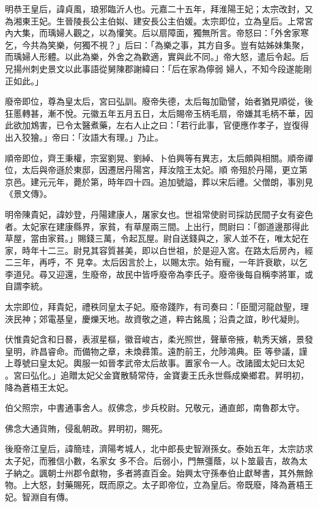 \begin{pinyinscope}
 明恭王皇后，諱貞風，琅邪臨沂人也。元嘉二十五年，拜淮陽王妃；太宗改封，又為湘東王妃。生晉陵長公主伯姒、建安長公主伯媛。太宗即位，立為皇后。上常宮內大集，而瑀婦人觀之，以為懽笑。后以扇障面，獨無所言。帝怒曰：「外舍家寒乞，今共為笑樂，何獨不視？」后曰：「為樂之事，其方自多。豈有姑姊妹集聚，而瑀婦人形體。以此為樂，外舍之為歡適，實與此不同。」帝大怒，遣后令起。后兄揚州刺史景文以此事語從舅陳郡謝緯曰：「后在家為儜弱
 婦人，不知今段遂能剛正如此。」



 廢帝即位，尊為皇太后，宮曰弘訓。廢帝失德，太后每加勖譬，始者猶見順從，後狂慝轉甚，漸不悅。元徽五年五月五日，太后賜帝玉柄毛扇，帝嫌其毛柄不華，因此欲加鴆害，已令太醫煮藥，左右人止之曰：「若行此事，官便應作孝子，豈復得出入狡獪。」帝曰：「汝語大有理。」乃止。



 順帝即位，齊王秉權，宗室劉晃、劉綽、卜伯興等有異志，太后頗與相關。順帝禪位，太后與帝遜於東邸，因遷居丹陽宮，拜汝陰王太妃。順
 帝殂於丹陽，更立第京邑。建元元年，薨於第，時年四十四。追加號謚，葬以宋后禮。父僧朗，事別見《景文傳》。



 明帝陳貴妃，諱妙登，丹陽建康人，屠家女也。世祖常使尉司採訪民間子女有姿色者。太妃家在建康縣界，家貧，有草屋兩三間。上出行，問尉曰：「御道邊那得此草屋，當由家貧。」賜錢三萬，令起瓦屋。尉自送錢與之，家人並不在，唯太妃在家，時年十二三。尉見其容質甚美，即以白世祖，於是迎入宮。在路太后房內，經二三年，再呼，不
 見幸。太后因言於上，以賜太宗。始有寵，一年許衰歇，以乞李道兒。尋又迎還，生廢帝，故民中皆呼廢帝為李氏子。廢帝後每自稱李將軍，或自謂李統。



 太宗即位，拜貴妃，禮秩同皇太子妃。廢帝踐阼，有司奏曰：「臣聞河龍啟聖，理浹民神；郊電基皇，慶爍天地。故資敬之道，粹古銘風；沿貴之誼，眇代凝則。


伏惟貴妃含和日晷，表淑星樞，徽音峻古，柔光照世，聲華帝掖，軌秀天嬪，景發皇明，祚昌睿命。而備物之章，未煥彞策。遠酌前王，允陟鴻典。臣
 等參議，謹上尊號曰皇太妃。輿服一如晉孝武帝太后故事。置家令一人。改諸國太妃曰太妃
 。宮曰弘化。」追贈太妃父金寶散騎常侍，金寶妻王氏永世縣成樂鄉君。昇明初，降為蒼梧王太妃。



 伯父照宗，中書通事舍人。叔佛念，步兵校尉。兄敬元，通直郎，南魯郡太守。



 佛念大通貨賄，侵亂朝政。昇明初，賜死。



 後廢帝江皇后，諱簡珪，濟陽考城人，北中郎長史智淵孫女。泰始五年，太宗訪求太子妃，而雅信小數，名家女
 多不合。后弱小，門無彊蔭，以卜筮最吉，故為太子納之。諷朝士州郡令獻物，多者將直百金。始興太守孫奉伯止獻琴書，其外無餘物。上大怒，封藥賜死，既而原之。太子即帝位，立為皇后。帝既廢，降為蒼梧王妃。智淵自有傳。




\end{pinyinscope}
